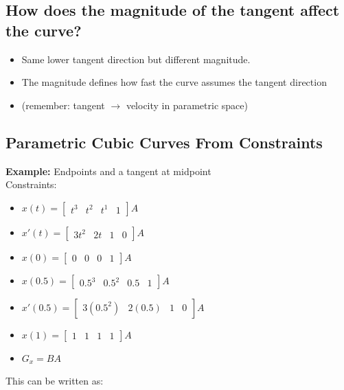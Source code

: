 \documentclass{article}
\begin{document}
\subsection*{How does the magnitude of the tangent affect the curve?}
\begin{itemize}
    \item Same lower tangent direction but different magnitude.
    \item The magnitude defines how fast the curve assumes the tangent direction
    \item (remember: tangent $\rightarrow$ velocity in parametric space)
\end{itemize}

\subsection*{Parametric Cubic Curves From Constraints}
\textbf{Example:} Endpoints and a tangent at midpoint\\
Constraints:
\begin{itemize}
    \item $x(t) = \begin{bmatrix}t^3 & t^2 & t^1 & 1\end{bmatrix}A$
    \item $x'(t) = \begin{bmatrix}3t^2 & 2t & 1 & 0\end{bmatrix}A$
    \item $x(0) = \begin{bmatrix} 0 & 0 & 0 & 1 \end{bmatrix}A$
    \item $x(0.5) = \begin{bmatrix} 0.5^3 & 0.5^2 & 0.5 & 1 \end{bmatrix}A$
    \item $x'(0.5) = \begin{bmatrix} 3(0.5^2) & 2(0.5) & 1 & 0 \end{bmatrix}A$
    \item $x(1) = \begin{bmatrix} 1 & 1 & 1 & 1 \end{bmatrix} A$
    \item $G_x = BA$
\end{itemize}
This can be written as:
\end{document}
